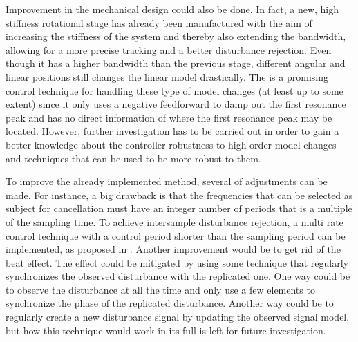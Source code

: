 Improvement in the mechanical design could also be done. In fact, a new, high stiffness rotational stage has already been manufactured with the aim of increasing the stiffness of the system and thereby also extending the bandwidth, allowing for a more precise tracking and a better disturbance rejection. Even though it has a higher bandwidth than the previous stage, different angular and linear positions still changes the linear model drastically. The \abbrIRC is a promising control technique for handling these type of model changes (at least up to some extent) since it only uses a negative feedforward to damp out the first resonance peak and has no direct information of where the first resonance peak may be located. However, further investigation has to be carried out in order to gain a better knowledge about the controller robustness to high order model changes and techniques that can be used to be more robust to them.

To improve the already implemented \abbrRFDC method, several of adjustments can be made. For instance, a big drawback is that the frequencies that can be selected as subject for cancellation must have an integer number of periods that is a multiple of the sampling time. To achieve intersample disturbance rejection, a multi rate control technique with a control period shorter than the sampling period can be implemented, as proposed in \citep{fujimoto2009rro}. Another improvement would be to get rid of the beat effect. The effect could be mitigated by using some technique that regularly synchronizes the observed disturbance with the replicated one. One way could be to observe the disturbance at all the time and only use a few elements to synchronize the phase of the replicated disturbance. Another way could be to regularly create a new disturbance signal by updating the observed signal model, but how this technique would work in its full is left for future investigation.
